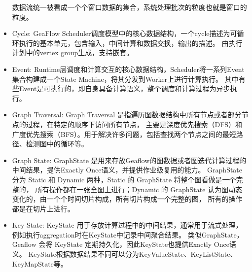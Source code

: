 \begin{itemize}
    数据流统一被看成一个个窗口数据的集合，系统处理批次的粒度也就是窗口的粒度。
  \item Cycle: GeaFlow Scheduler调度模型中的核心数据结构，一个cycle描述为可循环执行的基本单元，包含输入，中间计算和数据交换，输出的描述。
    由执行计划中的vertex group生成，支持嵌套。
  \item Event: Runtime层调度和计算交互的核心数据结构，Scheduler将一系列Event集合构建成一个State Machine，将其分发到Worker上进行计算执行。
    其中有些Event是可执行的，即自身具备计算语义，整个调度和计算过程为异步执行。
  \item Graph Traversal: Graph Traversal 是指遍历图数据结构中所有节点或者部分节点的过程，在特定的顺序下访问所有节点，
    主要是深度优先搜索（DFS）和 广度优先搜索（BFS）。用于解决许多问题，包括查找两个节点之间的最短路径、检测图中的循环等。
  \item Graph State:  GraphState 是用来存放Geaflow的图数据或者图迭代计算过程的中间结果，提供Exactly Once语义，并提供作业级复用的能力。
    GraphState 分为 Static 和 Dynamic 两种，Static 的 GraphState 将整个图看做是一个完整的，
    所有操作都在一张全图上进行；Dynamic 的 GraphState 认为图动态变化的，由一个个时间切片构成，所有切片构成一个完整的图，
    所有的操作都是在切片上进行。
  \item Key State:  KeyState 用于存放计算过程中的中间结果，通常用于流式处理，例如执行aggregation时在KeyState中记录中间聚合结果。
    类似GraphState，Geaflow 会将 KeyState 定期持久化，因此KeyState也提供Exactly Once语义。
    KeyState根据数据结果不同可以分为KeyValueState、KeyListState、KeyMapState等。
\end{itemize}

